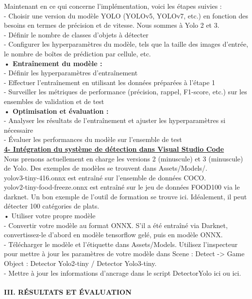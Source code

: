 \documentclass[a4paper, 13px]{article}
\begin{document}
Maintenant en ce qui concerne l’implémentation, voici les étapes suivies : \\
-	Choisir une version du modèle YOLO (YOLOv5, YOLOv7, etc.) en fonction des besoins en termes de précision et de vitesse. Nous sommes à Yolo 2 et 3.\\
-	Définir le nombre de classes d'objets à détecter\\
-	Configurer les hyperparamètres du modèle, tels que la taille des images d'entrée, le nombre de boîtes de prédiction par cellule, etc.\\

{\bfseries {•	Entraînement du modèle : }}\\
-	Définir les hyperparamètres d'entraînement\\
-	Effectuer l'entraînement en utilisant les données préparées à l'étape 1\\
-	Surveiller les métriques de performance (précision, rappel, F1-score, etc.) sur les ensembles de validation et de test\\

{\bfseries {•	Optimisation et évaluation : }}\\
-	Analyser les résultats de l'entraînement et ajuster les hyperparamètres si nécessaire\\
-	Évaluer les performances du modèle sur l'ensemble de test\\

{\bfseries \underline{4-	Intégration du système de détection dans Visual Studio Code}}\\

Nous prenons actuellement en charge les versions 2 (minuscule) et 3 (minuscule) de Yolo. Des exemples de modèles se trouvent dans Assets/Models/.\\
yolov3-tiny-416.onnx est entraîné sur l'ensemble de données COCO.\\
yolov2-tiny-food-freeze.onnx est entraîné sur le jeu de données FOOD100 via le darknet. Un bon exemple de l'outil de formation se trouve ici. Idéalement, il peut détecter 100 catégories de plats.\\
•	Utiliser votre propre modèle\\
-	Convertir votre modèle au format ONNX. S'il a été entraîné via Darknet, convertissez-le d'abord en modèle tensorflow gelé, puis en modèle ONNX.\\
-	Télécharger le modèle et l'étiquette dans Assets/Models. Utilisez l'inspecteur pour mettre à jour les paramètres de votre modèle dans Scene : Detect -> Game Object : Detector Yolo2-tiny / Detector Yolo3-tiny. \\
-	Mettre à jour les informations d'ancrage dans le script DetectorYolo ici ou ici.\\
 \\
{\bfseries \MakeUppercase{III. Résultats et évaluation}}\\
\end{document}
